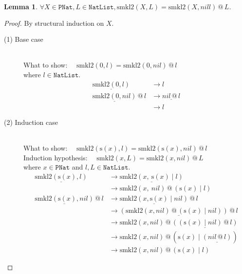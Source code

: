 \documentclass[12pt, a4paper]{article}
\newtheorem{lemma}[theorem]{Lemma}
\newcommand{\rel}[1]{\mathrel{#1}}
\newcommand{\rmx}[1]{\mathrm{#1}}
\newcommand{\larrow}{\longrightarrow}
\newcommand{\under}{\underline}
\begin{document}
\begin{lemma}
\label{lm2}
$\forall X \in \mathtt{PNat}, L \in \mathtt{NatList}, \rmx{smkl2}(X, L) = \rmx{smkl2}(X, nill) \rel{@} L$.
\end{lemma}
\begin{proof}
By structural induction on $X$.

\begin{description}

\item[(1) Base case]~\\
\noindent
What to show: $\quad\rmx{smkl2}(0, l) = \rmx{smkl2}(0, nil) \rel{@} l$ \\
where $l \in \mathtt{NatList}$.
\begin{align*}
\under{\rmx{smkl2}(0, l)}
	&\larrow l \tag{by smkl2-1} \\
\under{\rmx{smkl2}(0, nil)} \rel{@} l 
	&\larrow \under{nil \rel{@} l} \tag{by smkl2-1} \\
	&\larrow l \tag{by @1}
\end{align*}

\item[(2) Induction case]~\\
What to show: $\quad\rmx{smkl2}(\rmx{s}(x), l) = \rmx{smkl2}(\rmx{s}(x), nil) \rel{@} l$ \\
Induction hypothesis: $\quad\rmx{smkl2}(x, L) = \rmx{smkl2}(x, nil) \rel{@} L$ \\
where $x \in \mathtt{PNat}$ and $l, L \in \mathtt{NatList}$.
\begin{align*}
\under{\rmx{smkl2}(\rmx{s}(x), l)} 
	&\larrow \under{\rmx{smkl2}(x,\ \rmx{s}(x) \rel{|} l)} \tag{by smkl2-2} \\
	&\larrow \rmx{smkl2}(x,\ nil) \rel{@} (\rmx{s}(x) \rel{|} l) \tag{by IH} \\
\under{\rmx{smkl2}(\rmx{s}(x), nil)} \rel{@} l
	&\larrow \under{\rmx{smkl2}(x, \rmx{s}(x) \rel{|} nil)} \rel{@} l \tag{by smkl2-2} \\
	&\larrow \under{(\rmx{smkl2}(x, nil) \rel{@} (\rmx{s}(x) \rel{|} nil)) \rel{@} l} \tag{by IH} \\
	&\larrow \rmx{smkl2}(x, nil) \rel{@} \under{((\rmx{s}(x) \rel{|} nil) \rel{@} l)} \tag{by assoc@} \\
	&\larrow \rmx{smkl2}(x, nil) \rel{@} (\rmx{s}(x) \rel{|} \under{(nil \rel{@} l)}) \tag{by @2} \\
	&\larrow \rmx{smkl2}(x, nil) \rel{@} (\rmx{s}(x) \rel{|} l) \tag{by @1}
\end{align*}

\end{description}
\end{proof}
\end{document}
